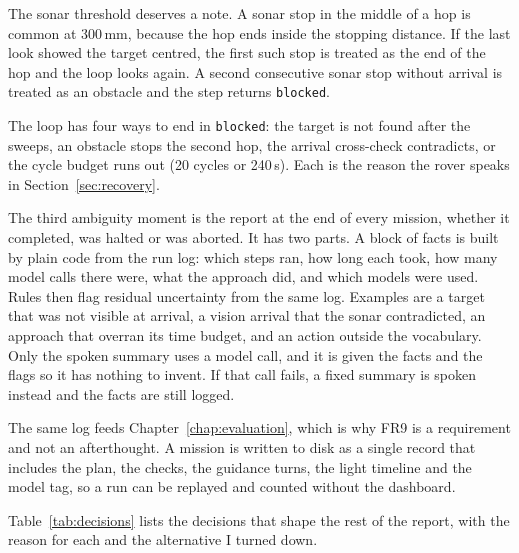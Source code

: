 The sonar threshold deserves a note. A sonar stop in the middle of a hop is common
at 300\,mm, because the hop ends inside the stopping distance. If the last look
showed the target centred, the first such stop is treated as the end of the hop and
the loop looks again. A second consecutive sonar stop without arrival is treated as
an obstacle and the step returns \texttt{blocked}. %

The loop has four ways to end in \texttt{blocked}: the target is not found after
the sweeps, an obstacle stops the second hop, the arrival cross-check
contradicts, or the cycle budget runs out (20 cycles or 240\,s). Each is the
reason the rover speaks in Section~\ref{sec:recovery}.

\label{ssec:line_follower}

\label{sec:report}

The third ambiguity moment is the report at the end of every mission, whether it
completed, was halted or was aborted. It has two parts. A block of facts is built
by plain code from the run log: which steps ran, how long each took, how many
model calls there were, what the approach did, and which models were used. Rules
then flag residual uncertainty from the same log. Examples are a target that was
not visible at arrival, a vision arrival that the sonar contradicted, an approach
that overran its time budget, and an action outside the vocabulary. Only the
spoken summary uses a model call, and it is given the facts and the flags so it
has nothing to invent. If that call fails, a fixed summary is spoken instead and
the facts are still logged.

The same log feeds Chapter~\ref{chap:evaluation}, which is why FR9 is a
requirement and not an afterthought. A mission is written to disk as a single
record that includes the plan, the checks, the guidance turns, the light timeline
and the model tag, so a run can be replayed and counted without the dashboard.

\label{sec:design_decisions}

Table~\ref{tab:decisions} lists the decisions that shape the rest of the report,
with the reason for each and the alternative I turned down.

